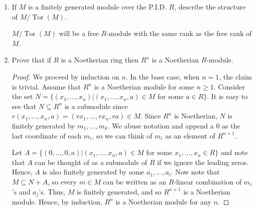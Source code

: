 \documentclass{report}
\DeclareMathOperator{\Tor}{Tor}
\DeclareMathOperator{\An}{Ann}
\begin{document}
\begin{enumerate}
\begin{proof}
			When $N$ is a finitely generated torsion $R$-module, simply let $r=r_1...r_m$ where $r_ia_i=0$ for each generator $a_i$. Then $ra_i=0$ for all $a_i$,
			and hence $r\in\An(N)$.
		\end{proof}
		
		\setcounter{enumi}{12}
	\item If $M$ is a finitely generated module over the P.I.D. $R$, describe the structure of $M / \Tor(M)$.
		\newline

		$M / \Tor(M)$ will be a free $R$-module with the same rank as the free rank of $M$.
		\setcounter{enumi}{14}
	\item Prove that if $R$ is a Noetherian ring then $R^n$ is a Noetherian $R$-module.
		\begin{proof}
			We proceed by induction on $n$. In the base case, when $n=1$, the claim is trivial. Assume that $R^{n}$ is a Noetherian module for some $n\geq 1$.
			Consider the set $N=\{(x_1,...,x_n)|(x_1,...,x_n,a)\in M\text{ for some } a\in R \}$.
			It is easy to see that $N\subseteq R^n$ is a submodule since $r(x_1,...,x_n,a)=(rx_1,...,rx_n,ra)\in M$.
			Since $R^n$ is Noetherian, $N$ is finitely generated by $m_1,...,m_k$. We abuse notation and append a $0$ as the last coordinate of each $m_i$,
			so we can think of $m_i$ as an element of $R^{n+1}$. 
			\newline

			Let $A=\{(0,...,0,a)|(x_1,...,x_n,a)\in M \text{ for some }x_1,...,x_n \in R\}$ and note that $A$ can be thought of as a submodule of $R$ if we ignore the leading zeros.
			Hence, $A$ is also finitely generated by some $a_1,...,a_l$. Now note that $M\subseteq N+A$, so every $m\in M$ can be written as an
			$R$-linear combination of $m_i$'s and $a_j$'s. Thus, $M$ is finitely generated, and so $R^{n+1}$ is a Noetherian module.
			Hence, by induction, $R^n$ is a Noetherian module for any $n$.
		\end{proof}
\end{enumerate}
\end{document}
